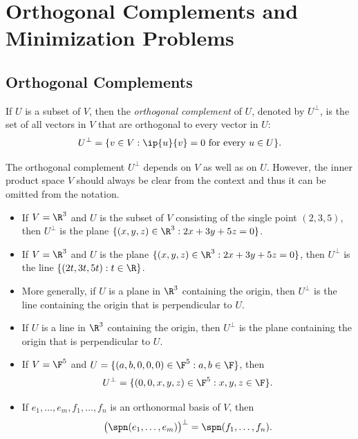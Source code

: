 \iftestbuild %
\setcounter{section}{2}\setcounter{theorem}{45}
\fi %
\DeclareRobustCommand\axeqstep[1]{\refstepcounter{theorem}\label{#1}}
\DeclareRobustCommand\axeqtag{\tag*{\thetheorem}}
\section{Orthogonal Complements and Minimization Problems}

\subsection{Orthogonal Complements}

\begin{definition}\label{ax:6.46}
If $U$ is a subset of $V$, then the \emph{orthogonal complement} of $U$, denoted
by $U^\perp$, is the set of all vectors in $V$ that are orthogonal to every
vector in $U$:
\[ U^\perp = \{v\in V : \ip{u}{v}=0 \text{ for every } u\in U\}. \]
\end{definition}

The orthogonal complement $U^\perp$ depends on $V$ as well as on $U$. However,
the inner product space $V$ should always be clear from the context and thus it
can be omitted from the notation.

\begin{example}\label{ax:6.47}\leavevmode
\begin{itemize}
\item If $V=\R^3$ and $U$ is the subset of $V$ consisting of the single point
  $(2,3,5)$, then $U^\perp$ is the plane
  $\{(x,y,z)\in\R^3 : 2x+3y+5z=0\}$.
\item If $V=\R^3$ and $U$ is the plane $\{(x,y,z)\in\R^3 : 2x+3y+5z=0\}$, then
  $U^\perp$ is the line $\{(2t,3t,5t) : t\in\R\}$.
\item More generally, if $U$ is a plane in $\R^3$ containing the origin, then
  $U^\perp$ is the line containing the origin that is perpendicular to $U$.
\item If $U$ is a line in $\R^3$ containing the origin, then $U^\perp$ is the
  plane containing the origin that is perpendicular to $U$.
\item If $V=\F^5$ and $U=\{(a,b,0,0,0)\in\F^5 : a,b\in\F\}$, then
  \[ U^\perp = \{(0,0,x,y,z)\in\F^5 : x,y,z\in\F\}. \]
\item If $e_1,\dots,e_m,f_1,\dots,f_n$ is an orthonormal basis of $V$, then
  \[ \bigl(\spn(e_1,\dots,e_m)\bigr)^\perp = \spn(f_1,\dots,f_n). \]
\end{itemize}
\end{example}

